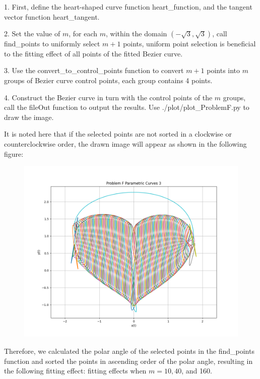\documentclass[a4paper]{article}
\begin{document}
1. First, define the heart-shaped curve function heart\_function, and the tangent vector function heart\_tangent.

2. Set the value of \( m \), for each \( m \), within the domain \((-\sqrt{3},\sqrt{3})\), call find\_points to uniformly select \( m+1 \) points, uniform point selection is beneficial to the fitting effect of all points of the fitted Bezier curve.

3. Use the convert\_to\_control\_points function to convert \( m+1 \) points into \( m \) groups of Bezier curve control points, each group contains 4 points.

4. Construct the Bezier curve in turn with the control points of the \( m \) groups, call the fileOut function to output the results. Use ./plot/plot\_ProblemF.py to draw the image.

It is noted here that if the selected points are not sorted in a clockwise or counterclockwise order, the drawn image will appear as shown in the following figure:
\begin{figure}[h]
    \centering
    \includegraphics[width=0.45\linewidth]{Pictures/ProblemF_withoutsort.png}
    
\end{figure}

\newpage
Therefore, we calculated the polar angle of the selected points in the find\_points function and sorted the points in ascending order of the polar angle, resulting in the following fitting effect: fitting effects when \( m = 10, 40 \), and 160.
\end{document}
